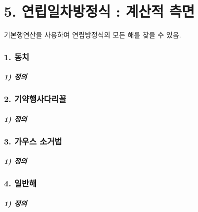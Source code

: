 \part*{5. 연립일차방정식 : 계산적 측면}

기본행연산을 사용하여 연립방정식의 모든 해를 찾을 수 있음.

\section*{1. 동치}
\subsubsection*{1) 정의\\}

\section*{2. 기약행사다리꼴}
\subsubsection*{1) 정의\\}

\section*{3. 가우스 소거법}
\subsubsection*{1) 정의\\}

\section*{4. 일반해}
\subsubsection*{1) 정의\\}




\newpage
